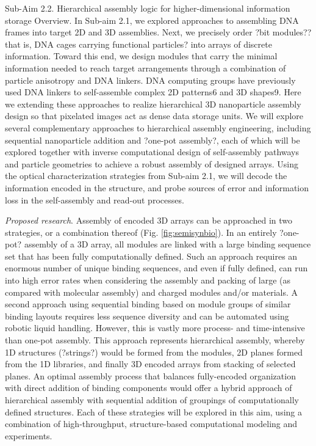 \documentclass[12pt, oneside]{article}   	%
\begin{document}
Sub-Aim 2.2. Hierarchical assembly logic for higher-dimensional information storage
Overview. In Sub-aim 2.1, we explored approaches to assembling DNA frames into target 2D and 3D assemblies. Next, we precisely order ?bit modules??that is, DNA cages carrying functional particles? into arrays of discrete information. Toward this end, we design modules that carry the minimal information needed to reach target arrangements through a combination of particle anisotropy and DNA linkers. DNA
 computing groups have previously used DNA linkers to self-assemble complex 2D patterns6 and 3D shapes9. Here we extending these approaches to realize hierarchical 3D nanoparticle assembly design so that pixelated images act as dense data storage units. We will explore several complementary approaches to hierarchical assembly engineering, including sequential nanoparticle addition and ?one-pot assembly?, each of which will be explored together with inverse computational design of self-assembly pathways and particle geometries to achieve a robust assembly of designed arrays. Using the optical characterization strategies from Sub-aim 2.1, we will decode the information encoded in the structure, and probe sources of error and information loss in the self-assembly and read-out processes.

\textit{Proposed research}. Assembly of encoded 3D arrays can be approached in two strategies, or a combination thereof (Fig. \ref{fig:semisynbio}). In an entirely ?one-pot? assembly of a 3D array, all modules are linked with a large binding sequence set that has been fully computationally defined. Such an approach requires an enormous number of unique binding sequences, and even if fully defined, can run into high error rates when considering the assembly and packing of large (as compared with molecular assembly) and charged modules and/or materials. A second approach using sequential binding based on module groups of similar binding layouts requires less sequence diversity and can be automated using robotic liquid handling. However, this is vastly more process- and time-intensive than one-pot assembly. This approach represents hierarchical assembly, whereby 1D structures (?strings?) would be formed from the modules, 2D planes formed from the 1D libraries, and finally 3D encoded arrays from stacking of selected planes. An optimal assembly process that balances fully-encoded organization with direct addition of binding components would offer a hybrid approach of hierarchical assembly with sequential addition of groupings of computationally defined structures. Each of these strategies will be explored in this aim, using a combination of high-throughput, structure-based computational modeling and experiments.
\end{document}
